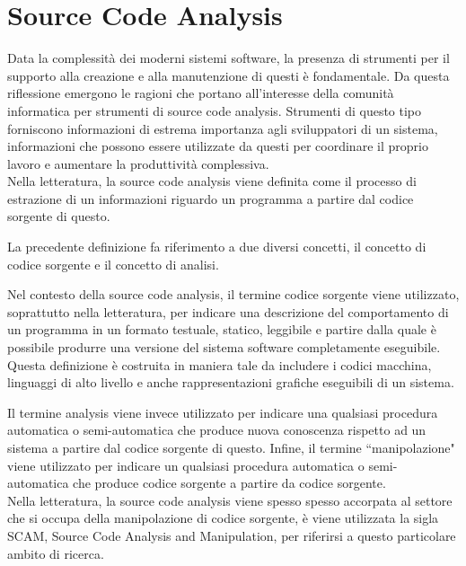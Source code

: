 \section{Source Code Analysis}

Data la complessità dei moderni sistemi software, la presenza di strumenti per
il supporto alla creazione e alla manutenzione di questi è fondamentale. Da
questa riflessione emergono le ragioni che portano all’interesse della comunità
informatica per strumenti di source code analysis. Strumenti di questo tipo
forniscono informazioni di estrema importanza agli sviluppatori di un sistema,
informazioni che possono essere utilizzate da questi per coordinare il proprio
lavoro e aumentare la produttività complessiva.\\

Nella letteratura, la source code analysis viene definita come il processo di
estrazione di un informazioni riguardo un programma a partire dal codice
sorgente di questo.

La precedente definizione fa riferimento a due diversi concetti, il concetto di
codice sorgente e il concetto di analisi.

Nel contesto della source code analysis, il termine codice sorgente viene
utilizzato, soprattutto nella letteratura, per indicare una descrizione del
comportamento di un programma in un formato testuale, statico, leggibile e
partire dalla quale è possibile produrre una versione del sistema software
completamente eseguibile. Questa definizione è costruita in maniera tale da
includere i codici macchina, linguaggi di alto livello e anche rappresentazioni
grafiche eseguibili di un sistema.

Il termine analysis viene invece utilizzato per indicare una qualsiasi procedura
automatica o semi-automatica che produce nuova conoscenza rispetto ad un sistema
a partire dal codice sorgente di questo. Infine, il termine “manipolazione"
viene utilizzato per indicare un qualsiasi procedura automatica o semi-
automatica che produce codice sorgente a partire da codice sorgente.
\cite{DBLP:journals/jss/DeanHKV06} \cite{DBLP:conf/icse/Binkley07}\\

Nella letteratura, la source code analysis viene spesso spesso accorpata al
settore che si occupa della manipolazione di codice sorgente, è viene utilizzata
la sigla SCAM, Source Code Analysis and Manipulation, per riferirsi a questo
particolare ambito di ricerca. \cite{DBLP:conf/scam/2001}\\

